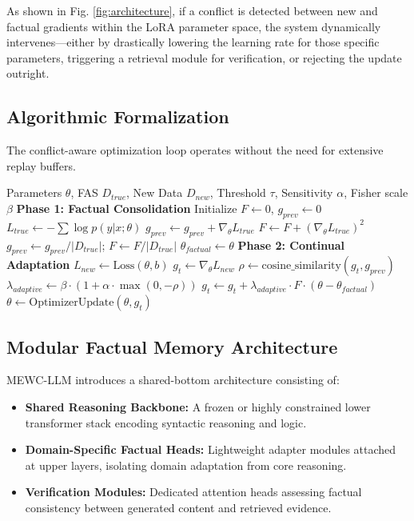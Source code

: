 \documentclass[10pt, conference, letterpaper]{IEEEtran}
\begin{document}
As shown in Fig. \ref{fig:architecture}, if a conflict is detected between new and factual gradients within the LoRA parameter space, the system dynamically intervenes—either by drastically lowering the learning rate for those specific parameters, triggering a retrieval module for verification, or rejecting the update outright.

\subsection{Algorithmic Formalization}
The conflict-aware optimization loop operates without the need for extensive replay buffers.

\begin{algorithm}
\caption{MEWC-LLM Conflict-Aware Optimization}
\label{alg:mewc}
\begin{algorithmic}[1]
\REQUIRE Parameters $\theta$, FAS $D_{true}$, New Data $D_{new}$, Threshold $\tau$, Sensitivity $\alpha$, Fisher scale $\beta$
\STATE \textbf{Phase 1: Factual Consolidation}
\STATE Initialize $F \leftarrow 0$, $g_{prev} \leftarrow 0$
    \STATE $L_{true} \leftarrow -\sum \log p(y|x; \theta)$
    \STATE $g_{prev} \leftarrow g_{prev} + \nabla_\theta L_{true}$
    \STATE $F \leftarrow F + (\nabla_\theta L_{true})^2$ \hfill {}
\ENDFOR
\STATE $g_{prev} \leftarrow g_{prev} / |D_{true}|$; $F \leftarrow F / |D_{true}|$
\STATE $\theta_{factual} \leftarrow \theta$
\STATE \textbf{Phase 2: Continual Adaptation}
    \STATE $L_{new} \leftarrow \text{Loss}(\theta, b)$
    \STATE $g_t \leftarrow \nabla_\theta L_{new}$
    \STATE $\rho \leftarrow \text{cosine\_similarity}(g_t, g_{prev})$
    \IF{$\rho < \tau$}
        \STATE $\lambda_{adaptive} \leftarrow \beta \cdot (1 + \alpha \cdot \max(0, -\rho))$
        \STATE $g_t \leftarrow g_t + \lambda_{adaptive} \cdot F \cdot (\theta - \theta_{factual})$
    \ENDIF
    \STATE $\theta \leftarrow \text{OptimizerUpdate}(\theta, g_t)$
\ENDFOR
\end{algorithmic}
\end{algorithm}

\subsection{Modular Factual Memory Architecture}
MEWC-LLM introduces a shared-bottom architecture consisting of:
\begin{itemize}
    \item \textbf{Shared Reasoning Backbone:} A frozen or highly constrained lower transformer stack encoding syntactic reasoning and logic.
    \item \textbf{Domain-Specific Factual Heads:} Lightweight adapter modules attached at upper layers, isolating domain adaptation from core reasoning.
    \item \textbf{Verification Modules:} Dedicated attention heads assessing factual consistency between generated content and retrieved evidence.
\end{itemize}
\end{document}
